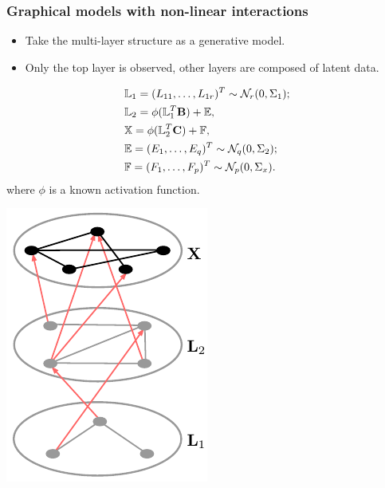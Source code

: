\documentclass[10pt]{beamer}
\theoremstyle{definition}
\begin{document}
\begin{frame}
\frametitle{Graphical models with non-linear interactions}

\begin{minipage}{.49\textwidth}
%
\begin{itemize}
\item Take the multi-layer structure as a generative model.
\vspace{1em}

\item Only the top layer is observed, other layers are composed of latent data.

\end{itemize}

{\color{black}
\begin{align*}
& {\mathbb{L}}_1 = (L_{11}, \ldots, L_{1r})^T \sim {\cal{N}}_r (0, \Sigma_1);\\
& {\mathbb{L}}_2 = \phi( {\mathbb{L}}_1^T {\mathbf{B}}) + {\mathbb{E}},\\
& {\mathbb{X}} = \phi( {\mathbb{L}}_2^T {\mathbf{C}}) + {\mathbb{F}},\\
& {\mathbb{E}} = (E_1, \ldots, E_q)^T \sim {\cal{N}}_q (0, \Sigma_2);\\
& {\mathbb{F}} = (F_1, \ldots, F_p)^T \sim {\cal{N}}_p (0, \Sigma_x).\\
\end{align*}}
%
where $\phi$ is a known activation function.

\end{minipage}
%
\begin{minipage}{.49\textwidth}
\centering
\includegraphics[height=.7\textheight]{../MS/latentmultilayer}
\end{minipage}
\end{frame}
\end{document}
